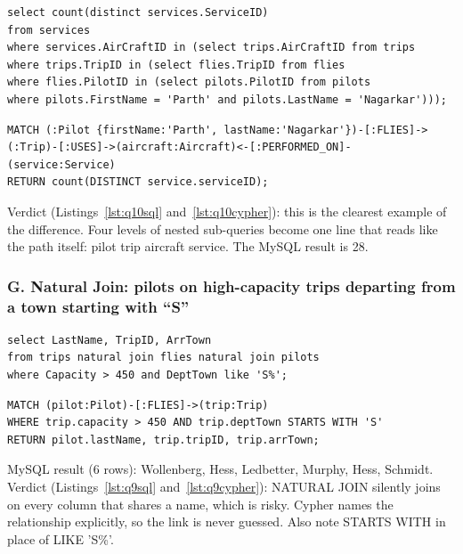 \documentclass[11pt,a4paper]{article}
\begin{document}
\begin{lstlisting}[style=sqlcode,caption={Services on aircraft flown by one pilot, in SQL: four levels of nested sub-queries},label={lst:q10sql}]
select count(distinct services.ServiceID)
from services
where services.AirCraftID in (select trips.AirCraftID from trips
where trips.TripID in (select flies.TripID from flies
where flies.PilotID in (select pilots.PilotID from pilots
where pilots.FirstName = 'Parth' and pilots.LastName = 'Nagarkar')));
\end{lstlisting}

\begin{lstlisting}[style=cyphercode,caption={The same question in Cypher, expressed as a single path},label={lst:q10cypher}]
MATCH (:Pilot {firstName:'Parth', lastName:'Nagarkar'})-[:FLIES]->(:Trip)-[:USES]->(aircraft:Aircraft)<-[:PERFORMED_ON]-(service:Service)
RETURN count(DISTINCT service.serviceID);
\end{lstlisting}

Verdict (Listings~\ref{lst:q10sql} and~\ref{lst:q10cypher}): this is the clearest example of the difference. Four levels of nested sub-queries become one line that reads like the path itself: pilot \textrightarrow{} trip \textrightarrow{} aircraft \textrightarrow{} service. The MySQL result is 28.

\subsubsection*{G. Natural Join: pilots on high-capacity trips departing from a town starting with ``S''}

\begin{lstlisting}[style=sqlcode,caption={High-capacity trips from towns beginning with S, in SQL, using NATURAL JOIN},label={lst:q9sql}]
select LastName, TripID, ArrTown
from trips natural join flies natural join pilots
where Capacity > 450 and DeptTown like 'S%';
\end{lstlisting}

\begin{lstlisting}[style=cyphercode,caption={The same query in Cypher, naming the relationship explicitly},label={lst:q9cypher}]
MATCH (pilot:Pilot)-[:FLIES]->(trip:Trip)
WHERE trip.capacity > 450 AND trip.deptTown STARTS WITH 'S'
RETURN pilot.lastName, trip.tripID, trip.arrTown;
\end{lstlisting}

MySQL result (6 rows): Wollenberg, Hess, Ledbetter, Murphy, Hess, Schmidt. Verdict (Listings~\ref{lst:q9sql} and~\ref{lst:q9cypher}): NATURAL JOIN silently joins on every column that shares a name, which is risky. Cypher names the relationship explicitly, so the link is never guessed. Also note STARTS WITH in place of LIKE 'S\%'.
\end{document}
